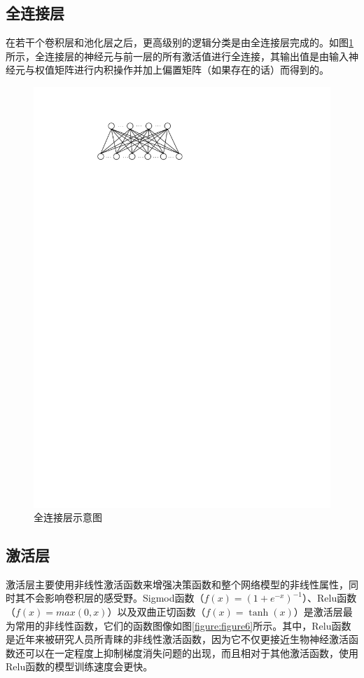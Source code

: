 \subsection{全连接层}

在若干个卷积层和池化层之后，更高级别的逻辑分类是由全连接层完成的。如图\ref{figure:figure5}所示，全连接层的神经元与前一层的所有激活值进行全连接，其输出值是由输入神经元与权值矩阵进行内积操作并加上偏置矩阵（如果存在的话）而得到的。

\begin{figure}[htbp]
    \begin{center}
    \includegraphics{figures/fc.pdf}
    \end{center}
    \caption{全连接层示意图}\label{figure:figure5}
\end{figure}

\subsection{激活层}
\label{chapter:chapter2-1-4}
激活层主要使用非线性激活函数来增强决策函数和整个网络模型的非线性属性，同时其不会影响卷积层的感受野。Sigmod函数（$f(x)=(1+e^{-x})^{-1}$）、Relu函数（$f(x)=max(0,x)$）以及双曲正切函数（$f(x)=\tanh(x)$）是激活层最为常用的非线性函数，它们的函数图像如图\ref{figure:figure6}所示。其中，Relu函数是近年来被研究人员所青睐的非线性激活函数，因为它不仅更接近生物神经激活函数还可以在一定程度上抑制梯度消失问题的出现，而且相对于其他激活函数，使用Relu函数的模型训练速度会更快。

